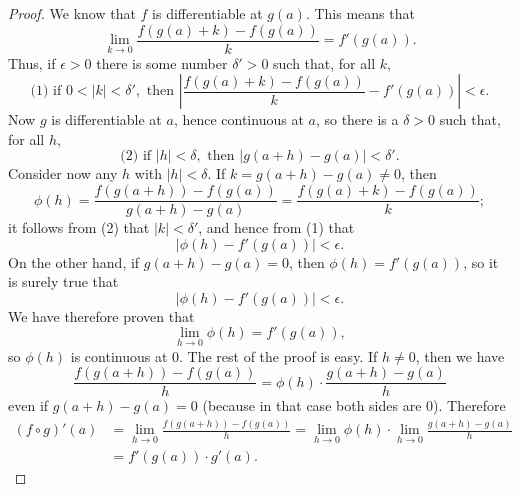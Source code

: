\documentclass{article}
\begin{document}
\begin{proof}
  We know that $f$ is differentiable at $g(a)$. This means that
  \begin{equation*}
    \lim_{k \rightarrow 0}\frac{f(g(a) + k) - f(g(a))}{k} = f'(g(a)).
  \end{equation*}
  Thus, if $\epsilon > 0$ there is some number $\delta' > 0$ such that, for all
  $k$, \begin{equation*}
    \text{(1) if } 0 < |k| < \delta', \text{ then } \left|\frac{f(g(a) + k) -
      f(g(a))}{k} - f'(g(a))\right| < \epsilon.
  \end{equation*}
  Now $g$ is differentiable at $a$, hence continuous at $a$, so there is a
  $\delta > 0$ such that, for all $h$, \begin{equation*}
    \text{(2) if } |h| < \delta, \text{ then } |g(a + h) - g(a)| < \delta'.
  \end{equation*}
  Consider now any $h$ with $|h| < \delta$. If $k = g(a + h) - g(a) \neq 0$,
  then \begin{equation*}
    \phi(h) = \frac{f(g(a + h)) - f(g(a))}{g(a + h) - g(a)} = \frac{f(g(a) + k)
      - f(g(a))}{k};
  \end{equation*} it follows from (2) that $|k| < \delta'$, and hence from (1)
  that \begin{equation*}
    |\phi(h) - f'(g(a))| < \epsilon.
  \end{equation*}
  On the other hand, if $g(a + h) - g(a) = 0$, then $\phi(h) = f'(g(a))$, so it
  is surely true that \begin{equation*}
    |\phi(h) - f'(g(a))| < \epsilon.
  \end{equation*}
  We have therefore proven that \begin{equation*}
    \lim_{h \rightarrow 0}\phi(h) = f'(g(a)),
  \end{equation*} so $\phi(h)$ is continuous at 0. The rest of the proof is
  easy. If $h \neq 0$, then we have \begin{equation*}
    \frac{f(g(a + h)) - f(g(a))}{h} = \phi(h) \cdot \frac{g(a + h) - g(a)}{h}
  \end{equation*} even if $g(a + h) - g(a) = 0$ (because in that case both
  sides are 0). Therefore \begin{align*}
    (f \circ g)'(a) &= \lim_{h \rightarrow 0}\frac{f(g(a + h)) - f(g(a))}{h} =
      \lim_{h \rightarrow 0}\phi(h) \cdot \lim_{h \rightarrow 0}\frac{g(a + h)
      - g(a)}{h} \\
      &= f'(g(a)) \cdot g'(a).
  \end{align*}
\end{proof}
\end{document}
